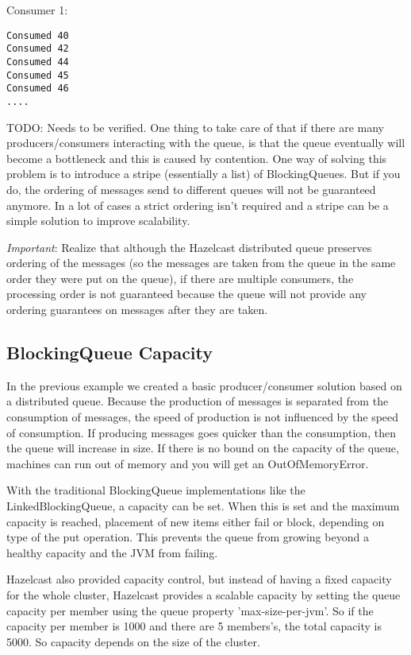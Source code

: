 Consumer 1:
\begin{lstlisting}
Consumed 40  
Consumed 42 
Consumed 44 
Consumed 45
Consumed 46
....
\end{lstlisting}

TODO: Needs to be verified.
One thing to take care of that if there are many producers/consumers interacting with the queue, is that the queue eventually will become a bottleneck and this is caused by contention. One way of solving this problem is to introduce a stripe (essentially a list) of BlockingQueues. But if you do, the ordering of messages send to different queues will not be guaranteed anymore. In a lot of cases a strict ordering isn't required and a stripe can be a simple solution to improve scalability.

\emph{Important}: Realize that although the Hazelcast distributed queue preserves ordering of the messages (so the messages are taken from the queue in the same order they were put on the queue), if there are multiple consumers, the processing order is not guaranteed because the queue will not provide any ordering guarantees on messages after they are taken.

\subsection{BlockingQueue Capacity}
In the previous example we created a basic producer/consumer solution based on a distributed queue. Because the production of messages is separated from the consumption of messages, the speed of production is not influenced by the speed of consumption. If producing messages goes quicker than the consumption, then the queue will increase in size. If there is no bound on the capacity of the queue, machines can run out of memory and you will get an OutOfMemoryError. 

With the traditional BlockingQueue implementations like the LinkedBlockingQueue, a capacity can be set. When this is set and the maximum capacity is reached, placement of new items either fail or block, depending on type of the put operation. This prevents the queue from growing beyond a healthy capacity and the JVM from failing.

Hazelcast also provided capacity control, but instead of having a fixed capacity for the whole cluster, Hazelcast provides a scalable capacity by setting the queue capacity per member using the queue property 'max-size-per-jvm'. So if the capacity per member is 1000 and there are 5 members's, the total capacity is 5000. So capacity depends on the size of the cluster.

